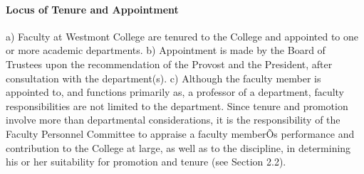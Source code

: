 \documentclass[letterpaper, 11pt]{article}
\begin{document}
			\paragraph{Locus of Tenure and Appointment}
				a) Faculty at Westmont College are tenured to the College and appointed to one or more academic departments.
				b) Appointment is made by the Board of Trustees upon the recommendation of the Provost and the President, after consultation with the department(s).
				c) Although the faculty member is appointed to, and functions primarily as, a professor of a department, faculty responsibilities are not limited to the department.  Since tenure and promotion involve more than departmental considerations, it is the responsibility of the Faculty Personnel Committee to appraise a faculty memberÕs performance and contribution to the College at large, as well as to the discipline, in determining his or her suitability for promotion and tenure (see Section 2.2).
\end{document}
